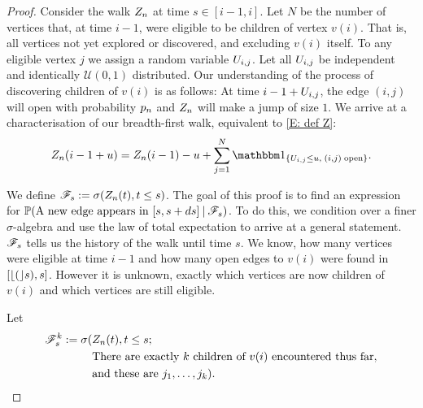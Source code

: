\begin{proof} \label{P: formula an}
	Consider the walk $Z_n$ at time $s\in[i-1, i]$.
	Let $N$ be the number of vertices that, at time $i-1$, were eligible to be children of vertex $v(i)$.
	That is, all vertices not yet explored or discovered, and excluding $v(i)$ itself.
	To any eligible vertex $j$ we assign a random variable $U_{i,j}$.
	Let all $U_{i,j}$ be independent and identically $\mathcal{U}(0,1)$ distributed.
	Our understanding of the process of discovering children of $v(i)$ is as follows:
	At time $i-1+U_{i,j}$, the edge $(i,j)$ will open with probability $p_n$ and
	$Z_n$ will make a jump of size $1$.
	We arrive at a characterisation of our breadth-first walk, 
	equivalent to \eqref{E: def Z}:	
	\begin{equation}
	\Zn(i-1+u) = \Zn(i-1) - u + \sum_{j=1}^{N} \Ind{\{\Uij \leq u, \; (i,j) \; \text{open}\}}.
	\end{equation}
	
	We define $\mathscr{F}_s := \sigma(Z_n(t), t\leq s)$.
	The goal of this proof is to find an expression for
	$\mathbb{P}(\text{A new edge appears in $[s, s+ds]$} \: | \: \mathscr{F}_s)$.
	To do this, we condition over a finer $\sigma$-algebra and use the law of total expectation to arrive at a general statement.
	$\mathscr{F}_s$ tells us the history of the walk until time $s$. 
	We know, how many vertices were eligible at time $i-1$ and how many open edges to $v(i)$ were found in $[\lfloor(\rfloor s),s]$.
	However it is unknown, exactly which vertices are now children of $v(i)$ and which vertices are still eligible.
	
	Let 
	\begin{equation}
	\begin{split}
	\mathscr{F}_s^k := \sigma(&Z_n(t), t\leq s; \\
	&\text{There are exactly $k$ children of $v(i)$ encountered thus far}, \\
	&\text{and these are $j_1, \dots, j_k$}).
	\end{split}
	\end{equation}
	

\end{proof}
